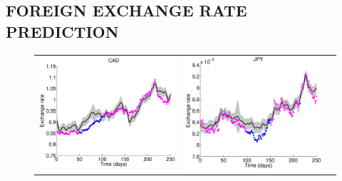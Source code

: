 \subsection{FOREIGN EXCHANGE RATE PREDICTION}
\begin{figure}
\centering
\begin{tabular}{ccc}
\includegraphics[scale=0.28]{figures/fxCAD.eps} &
\includegraphics[scale=0.28]{figures/fxJPY.eps} &

\end{tabular}
\end{figure}
